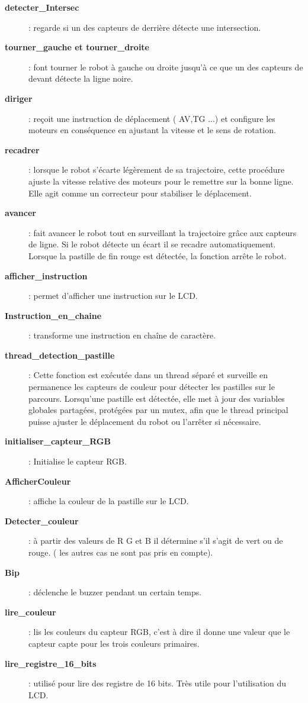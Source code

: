 \begin{description}
\item[\textbf{detecter\_Intersec}] : regarde si un des capteurs de derrière détecte une intersection.

\item[\textbf{tourner\_gauche et tourner\_droite }]: font tourner le robot à gauche ou droite jusqu'à ce que un des capteurs de devant détecte la ligne noire. 

\item[\textbf{diriger}]: reçoit une instruction de déplacement ( AV,TG ...) et configure les moteurs en conséquence en ajustant la vitesse et le sens de rotation.

\item[\textbf{recadrer}]: lorsque le robot s'écarte légèrement de sa trajectoire, cette procédure ajuste la vitesse relative des moteurs pour le remettre sur la bonne ligne.  Elle agit comme un correcteur pour stabiliser le déplacement.

\item[\textbf{avancer}] : fait avancer le robot tout en surveillant la trajectoire grâce aux capteurs de ligne. Si le robot détecte un écart il se recadre automatiquement. Lorsque la pastille de fin rouge est détectée, la fonction arrête le robot.

\item[\textbf{afficher\_instruction}]: permet d'afficher une instruction sur le LCD.

\item[\textbf{Instruction\_en\_chaine}]: transforme une instruction en chaîne de caractère.  

\item[\textbf{thread\_detection\_pastille}]: Cette fonction est exécutée dans un thread séparé et surveille en permanence les capteurs de couleur pour détecter les pastilles sur le parcours. Lorsqu’une pastille est détectée, elle met à jour des variables globales partagées, protégées par un mutex, afin que le thread principal puisse ajuster le déplacement du robot ou l’arrêter si nécessaire.

\item[\textbf{initialiser\_capteur\_RGB}]: Initialise le capteur RGB.

\item[\textbf{AfficherCouleur}]: affiche la couleur de la pastille sur le LCD.

\item[\textbf{Detecter\_couleur}]: à partir des valeurs de R G et B il détermine s'il s'agit de vert ou de rouge. ( les autres cas ne sont pas pris en compte).

\item[\textbf{Bip}]: déclenche le buzzer pendant un certain temps.

\item[\textbf{lire\_couleur}]: lis les couleurs du capteur RGB, c'est à dire il donne une valeur que le capteur capte pour les trois couleurs primaires.

\item[\textbf{lire\_registre\_16\_bits}]: utilisé pour lire des registre de 16 bits. Très utile pour l'utilisation du LCD.


\end{description}

